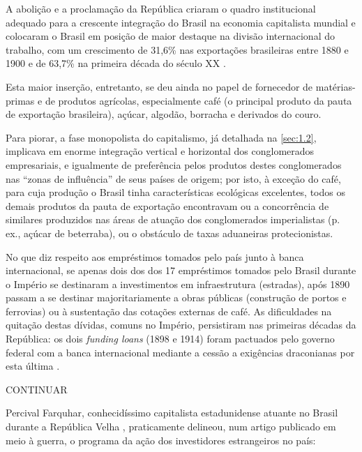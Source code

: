 A abolição e a proclamação da República criaram o quadro institucional adequado para a crescente integração do Brasil na economia capitalista mundial e colocaram o Brasil em posição de maior destaque na divisão internacional do trabalho, com um crescimento de 31,6\% nas exportações brasileiras entre 1880 e 1900 e de 63,7\% na primeira década do século XX \cite[p.~352]{singer_braecomu_1977}. 

Esta maior inserção, entretanto, se deu ainda no papel de fornecedor de matérias-primas e de produtos agrícolas, especialmente café (o principal produto da pauta de exportação brasileira), açúcar, algodão, borracha e derivados do couro.





Para piorar, a fase monopolista do capitalismo, já detalhada na \autoref{sec:1.2}, implicava em enorme integração vertical e horizontal dos conglomerados empresariais, e igualmente de preferência pelos produtos destes conglomerados nas ``zonas de influência'' de seus países de origem; por isto, à exceção do café, para cuja produção o Brasil tinha características ecológicas excelentes, todos os demais produtos da pauta de exportação encontravam ou a concorrência de similares produzidos nas áreas de atuação dos conglomerados imperialistas (p. ex., açúcar de beterraba), ou o obstáculo de taxas aduaneiras protecionistas.

No que diz respeito aos empréstimos tomados pelo país junto à banca internacional, se apenas dois dos dos 17 empréstimos tomados pelo Brasil durante o Império se destinaram a investimentos em infraestrutura (estradas), após 1890 passam a se destinar majoritariamente a obras públicas (construção de portos e ferrovias) ou à sustentação das cotações externas de café. As dificuldades na quitação destas dívidas, comuns no Império, persistiram nas primeiras décadas da República: os dois \textit{funding loans} (1898 e 1914) foram pactuados pelo governo federal com a banca internacional mediante a cessão a exigências draconianas por esta última \cite[p.~365]{singer_braecomu_1977}.

CONTINUAR

Percival Farquhar, conhecidíssimo capitalista estadunidense atuante no Brasil durante a República Velha \cite{CUNHA2011}, praticamente delineou, num artigo publicado em meio à guerra, o programa da ação dos investidores estrangeiros no país:

